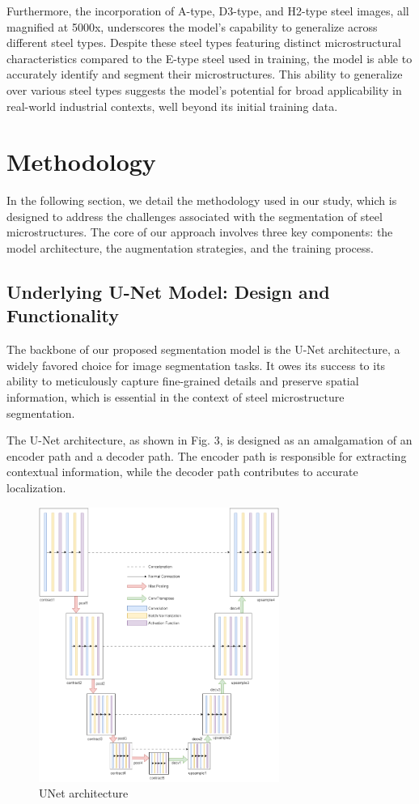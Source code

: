 \documentclass[]{article}
\begin{document}
Furthermore, the incorporation of A-type, D3-type, and H2-type steel images, all magnified at 5000x, underscores the model's capability to generalize across different steel types. Despite these steel types featuring distinct microstructural characteristics compared to the E-type steel used in training, the model is able to accurately identify and segment their microstructures. This ability to generalize over various steel types suggests the model's potential for broad applicability in real-world industrial contexts, well beyond its initial training data.

\section{Methodology}
In the following section, we detail the methodology used in our study, which is designed to address the challenges associated with the segmentation of steel microstructures. The core of our approach involves three key components: the model architecture, the augmentation strategies, and the training process.

\subsection{Underlying U-Net Model: Design and Functionality}

The backbone of our proposed segmentation model is the U-Net architecture, a widely favored choice for image segmentation tasks. It owes its success to its ability to meticulously capture fine-grained details and preserve spatial information, which is essential in the context of steel microstructure segmentation. 

The U-Net architecture, as shown in Fig. 3, is designed as an amalgamation of an encoder path and a decoder path. The encoder path is responsible for extracting contextual information, while the decoder path contributes to accurate localization.


\begin{figure}[ht]
	\centering
	\includegraphics[width=0.7\textwidth]{images/Unet.png}
	\caption{UNet architecture}
	\label{fig:imageModel}
\end{figure}
\end{document}
